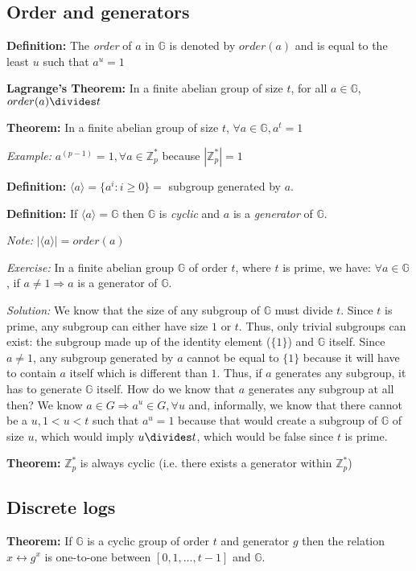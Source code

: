 \documentclass[11pt]{article}
\newcommand{\Zp}{\mathbb{Z}^{\ast}_p}
\newcommand{\G}{\mathbb{G}}
\newcommand{\gen}[1]{\langle #1 \rangle}
\newcommand{\definition}{\textbf{Definition:} }
\newcommand{\theoremof}[1]{\textbf{#1 Theorem:} }
\newcommand{\theorem}{\textbf{Theorem:} }
\newcommand{\note}{\emph{Note:} }
\newcommand{\example}{\emph{Example:} }
\begin{document}
\subsection{Order and generators}

\definition The \emph{order} of $a$ in $\G$ is denoted by $order(a)$ and is equal
to the least $u$ such that $a^u = 1$

\theoremof{Lagrange's} In a finite abelian group of size $t$, for all $a \in \G$,
$order(a) \divides t$

\theorem In a finite abelian group of size $t$, $\forall a \in \G, a^t = 1$

\example $a^{(p-1)} = 1, \forall a \in \Zp$ because $|\Zp| = 1$

\definition $\gen{a} = \{a^i : i \ge 0\} = $ subgroup generated by $a$.

\definition If $\gen{a} = \G$ then $\G$ is \emph{cyclic} and $a$ is a
\emph{generator} of $\G$.

\note $|\gen{a}| = order(a)$

\emph{Exercise:} In a finite abelian group $\G$ of order $t$, where $t$ is
prime, we have: $\forall a \in \G$, if $a \ne 1 \Rightarrow a$ is a generator of $\G$.

\emph{Solution:} We know that the size of any subgroup of $\G$ must divide $t$.
Since $t$ is prime, any subgroup can either have size $1$ or $t$. Thus, only
trivial subgroups can exist: the subgroup made up of the identity element
($\{1\}$) and $\G$ itself. Since $a \ne 1$, any subgroup generated by $a$ cannot
be equal to $\{1\}$ because it will have to contain $a$ itself which is
different than $1$.  Thus, if $a$ generates any subgroup, it has to generate
$\G$ itself. How do we know that $a$ generates any subgroup at all then? We know
$a \in G \Rightarrow a^u \in G, \forall u$ and, informally, we know that there
cannot be a $u, 1 < u < t$ such that $a^u = 1$ because that would create a
subgroup of $\G$ of size $u$, which would imply $u \divides t$, which would be
false since $t$ is prime.

\theorem $\Zp$ is always cyclic (i.e. there exists a generator within $\Zp$)

\subsection{Discrete logs}

\theorem If $\G$ is a cyclic group of order $t$ and generator $g$ then the relation
$x \leftrightarrow g^x$ is one-to-one between $[0, 1, \dots, t-1]$ and $\G$.
\end{document}
